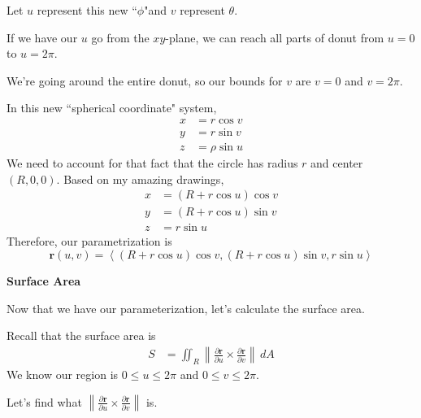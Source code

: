 \documentclass{article}
\newcommand{\lrp}[1]{\left( #1 \right)}
\newcommand{\lra}[1]{\left\langle #1 \right\rangle}
\newcommand{\norm}[1]{\left\lVert #1 \right\rVert}
\renewcommand{\r}[0]{\mathbf{r}}
\begin{document}
Let $u$ represent this new ``$\phi$"and $v$ represent $\theta$.

If we have our $u$ go from the $xy$-plane, we can reach all parts of donut from $u =0$ to $u =2\pi$.

We're going around the entire donut, so our bounds for $v$ are $v=0$ and $v=2\pi$.


In this new ``spherical coordinate" system,
\begin{align*}
    x&=r\cos v\tag{$r=\rho\cos u$}\\
    y&=r\sin v\tag{$r=\rho\cos u$}\\
    z&=\rho\sin u
\end{align*}
We need to account for that fact that the circle has radius $r$ and center $(R,0,0)$. Based on my amazing drawings,
\begin{align*}
    x&=(R+r\cos u)\cos v\\
    y&=\lrp{R+r\cos u}\sin v\\
    z&=r\sin u
\end{align*}
Therefore, our parametrization is
\begin{equation*}
    \r(u,v)=\lra{(R+r\cos u)\cos v, (R+r\cos u)\sin v, r\sin u}\tag{$0\leq u\leq 2\pi$, $0\leq v\leq 2\pi$}
\end{equation*}
{}\textbf{Surface Area}

Now that we have our parameterization, let's calculate the surface area.

Recall that the surface area is
\begin{align*}
    S&=\iint_R \norm{\frac{\partial \r}{\partial u}\times \frac{\partial \r}{\partial v}}\,dA
\end{align*}
We know our region is $0\leq u\leq 2\pi$ and $0\leq v\leq 2\pi$.

Let's find what $\displaystyle\norm{\frac{\partial \r}{\partial u}\times \frac{\partial \r}{\partial v}} $ is.
\end{document}

